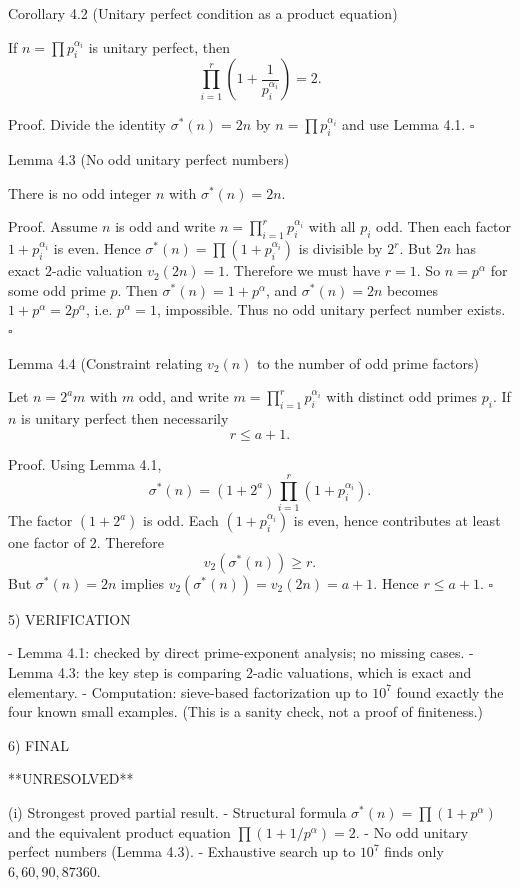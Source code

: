 Corollary 4.2 (Unitary perfect condition as a product equation)

If $n=\prod p_i^{\alpha_i}$ is unitary perfect, then
\[
  \prod_{i=1}^r \left(1+\frac{1}{p_i^{\alpha_i}}\right)=2.
\]

Proof.
Divide the identity $\sigma^*(n)=2n$ by $n=\prod p_i^{\alpha_i}$ and use Lemma 4.1.
$\square$

Lemma 4.3 (No odd unitary perfect numbers)

There is no odd integer $n$ with $\sigma^*(n)=2n$.

Proof.
Assume $n$ is odd and write $n=\prod_{i=1}^r p_i^{\alpha_i}$ with all $p_i$ odd.
Then each factor $1+p_i^{\alpha_i}$ is even.
Hence $\sigma^*(n)=\prod (1+p_i^{\alpha_i})$ is divisible by $2^r$.
But $2n$ has exact $2$-adic valuation $v_2(2n)=1$.
Therefore we must have $r=1$.
So $n=p^\alpha$ for some odd prime $p$.
Then $\sigma^*(n)=1+p^\alpha$, and $\sigma^*(n)=2n$ becomes
$1+p^\alpha = 2p^\alpha$, i.e. $p^\alpha=1$, impossible.
Thus no odd unitary perfect number exists.
$\square$

Lemma 4.4 (Constraint relating $v_2(n)$ to the number of odd prime factors)

Let $n=2^a m$ with $m$ odd, and write $m=\prod_{i=1}^r p_i^{\alpha_i}$ with distinct odd primes $p_i$.
If $n$ is unitary perfect then necessarily
\[
  r\le a+1.
\]

Proof.
Using Lemma 4.1,
\[
  \sigma^*(n)=(1+2^a)\prod_{i=1}^r (1+p_i^{\alpha_i}).
\]
The factor $(1+2^a)$ is odd.
Each $(1+p_i^{\alpha_i})$ is even, hence contributes at least one factor of $2$.
Therefore
\[
  v_2(\sigma^*(n))\ge r.
\]
But $\sigma^*(n)=2n$ implies $v_2(\sigma^*(n))=v_2(2n)=a+1$.
Hence $r\le a+1$.
$\square$

5) VERIFICATION

- Lemma 4.1: checked by direct prime-exponent analysis; no missing cases.
- Lemma 4.3: the key step is comparing 2-adic valuations, which is exact and elementary.
- Computation: sieve-based factorization up to $10^7$ found exactly the four known small examples.
  (This is a sanity check, not a proof of finiteness.)

6) FINAL

**UNRESOLVED**

(i) Strongest proved partial result.
- Structural formula $\sigma^*(n)=\prod (1+p^\alpha)$ and the equivalent product equation
  $\prod (1+1/p^\alpha)=2$.
- No odd unitary perfect numbers (Lemma 4.3).
- Exhaustive search up to $10^7$ finds only $6,60,90,87360$.

